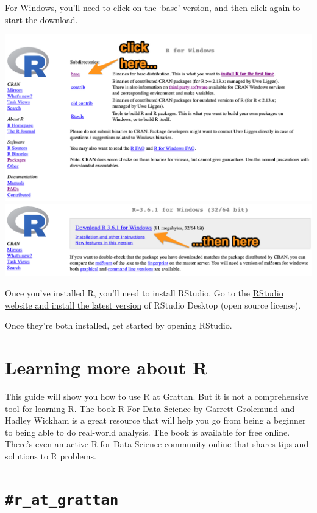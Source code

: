 \documentclass[]{book}
\begin{document}
For Windows, you'll need to click on the `base' version, and then click again to start the download.

\includegraphics[width=15.69in]{atlas/r_cran_windows_1}
\includegraphics[width=15.67in]{atlas/r_cran_windows_2}

Once you've installed R, you'll need to install RStudio. Go to the \href{https://www.rstudio.com/products/rstudio/download/\#download}{RStudio website and install the latest version} of RStudio Desktop (open source license).

Once they're both installed, get started by opening RStudio.

\hypertarget{learning-more-about-r}{%
\section{Learning more about R}\label{learning-more-about-r}}

This guide will show you how to use R at Grattan. But it is not a comprehensive tool for learning R. The book \href{https://r4ds.had.co.nz}{R For Data Science} by Garrett Grolemund and Hadley Wickham is a great resource that will help you go from being a beginner to being able to do real-world analysis. The book is available for free online. There's even an active \href{https://www.rfordatasci.com}{R for Data Science community online} that shares tips and solutions to R problems.

\hypertarget{r_at_grattan}{%
\section{\texorpdfstring{\texttt{\#r\_at\_grattan}}{\#r\_at\_grattan}}\label{r_at_grattan}}
\end{document}
